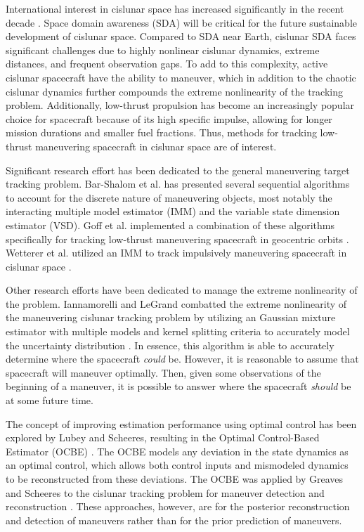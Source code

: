 \documentclass[letterpaper, preprint, paper,11pt]{AAS}	%
\begin{document}
International interest in cislunar space has increased significantly in the recent decade \cite{nelson2024moon} . Space domain awareness (SDA) will be critical for the future sustainable development of cislunar space. Compared to SDA near Earth, cislunar SDA faces significant challenges due to highly nonlinear cislunar dynamics, extreme distances, and frequent observation gaps. To add to this complexity, active cislunar spacecraft have the ability to maneuver, which in addition to the chaotic cislunar dynamics further compounds the extreme nonlinearity of the tracking problem. Additionally, low-thrust propulsion has become an increasingly popular choice for spacecraft because of its high specific impulse, allowing for longer mission durations and smaller fuel fractions. Thus, methods for tracking low-thrust maneuvering spacecraft in cislunar space are of interest. 

Significant research effort has been dedicated to the general maneuvering target tracking problem. Bar-Shalom et al. has presented several sequential algorithms to account for the discrete nature of maneuvering objects, most notably the interacting multiple model estimator \cite{bar2004estimation} (IMM) and the variable state dimension estimator \cite{bar2007variable} (VSD). Goff et al. implemented a combination of these algorithms specifically for tracking low-thrust maneuvering spacecraft in geocentric orbits \cite{goff2015orbit}. Wetterer et al. utilized an IMM to track impulsively maneuvering spacecraft in cislunar space \cite{wetterer2022cislunar}.

Other research efforts have been dedicated to manage the extreme nonlinearity of the problem. Iannamorelli and LeGrand combatted the extreme nonlinearity of the maneuvering cislunar tracking problem by utilizing an Gaussian mixture estimator with multiple models and kernel splitting criteria to accurately model the uncertainty distribution \cite{iannamorelli2025adaptive}. In essence, this algorithm is able to accurately determine where the spacecraft \textit{could} be. However, it is reasonable to assume that spacecraft will maneuver optimally. Then, given some observations of the beginning of a maneuver, it is possible to answer where the spacecraft \textit{should} be at some future time. 

The concept of improving estimation performance using optimal control has been explored by Lubey and Scheeres, resulting in the Optimal Control-Based Estimator (OCBE) \cite{lubey2013optimal}. The OCBE models any deviation in the state dynamics as an optimal control, which allows both control inputs and mismodeled dynamics to be reconstructed from these deviations. The OCBE was applied by Greaves and Scheeres to the cislunar tracking problem for maneuver detection and reconstruction \cite{greaves2021observation}. These approaches, however, are for the posterior reconstruction and detection of maneuvers rather than for the prior prediction of maneuvers. 
\end{document}
